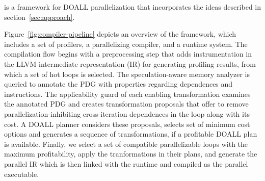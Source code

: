 %
\name is a framework for DOALL parallelization that incorporates the
ideas described in section~\ref{sec:approach}.


Figure~\ref{fig:compiler-pipeline} depicts an overview of the \name
framework, which includes a set of profilers, a parallelizing compiler,
and a runtime system.
%
The compilation flow begins with a preprocessing step that adds
instrumentation in the LLVM intermediate representation (IR) for
generating profiling results, from which a set of hot
loops is selected.
The speculation-aware memory analyzer
is queried to annotate the PDG with properties regarding dependences and
instructions. The applicability guard of each enabling
transformation examines the annotated PDG and creates transformation
proposals that offer to remove parallelization-inhibiting cross-iteration
dependences in the loop along with its cost. A DOALL planner considers
these proposals, selects set of minimum cost options and generates a sequence
of transformations, if a profitable DOALL plan is available.
Finally, we select a set of
compatible parallelizable loops with the maximum profitability, apply the
tranformations in their plans, and generate the parallel IR which is
then linked with the runtime and compiled as the parallel executable.


